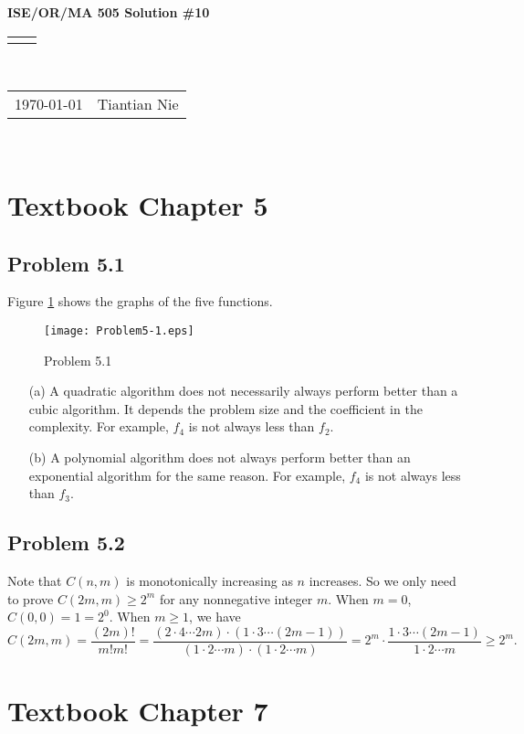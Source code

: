 \documentclass[11pt]{article}
\renewcommand{\title}[1]{\textbf{#1}\\}
\renewcommand{\line}{\begin{tabularx}{\textwidth}{X>{\raggedleft}X}\hline\\\end{tabularx}\\[-0.5cm]}
\newcommand{\leftright}[2]{\begin{tabularx}{\textwidth}{X>{\raggedleft}X}#1%
& #2\\\end{tabularx}\\[-0.5cm]}
\begin{document}
\title{ISE/OR/MA 505 Solution \#10}
\line
\leftright{\today}{Tiantian Nie} %

\section*{Textbook Chapter 5}
\subsection*{Problem 5.1}
Figure \ref{Problem5-1} shows the graphs of the five functions.
\begin{figure}[H]
  \centering
  \texttt{[image: Problem5-1.eps]}
  \caption{Problem 5.1}
  \label{Problem5-1}
\end{figure}
\begin{itemize}
  \item[(a)] A quadratic algorithm does not necessarily always perform better than a cubic algorithm. It depends the problem size and the coefficient in the complexity. For example, $f_4$ is not always less than $f_2$.
  \item[(b)] A polynomial algorithm does not always perform better than an exponential algorithm for the same reason. For example, $f_4$ is not always less than $f_3$.
\end{itemize}

\subsection*{Problem 5.2}
Note that $C(n,m)$ is monotonically increasing as $n$ increases. So we only need to prove $C(2m,m)\geq 2^m$ for any nonnegative integer $m$.
When $m=0$, $C(0,0)=1=2^0$.
When $m\geq 1$, we have
\begin{equation*}
  C(2m,m) = \frac{(2m)!}{m!m!} = \frac{(2\cdot4\cdots 2m)\cdot(1\cdot3\cdots (2m-1))}{(1\cdot2\cdots m)\cdot(1\cdot2\cdots m)} = 2^m\cdot\frac{1\cdot3\cdots (2m-1)}{1\cdot2\cdots m}\geq 2^m.
\end{equation*}

\section*{Textbook Chapter 7}
\end{document}
